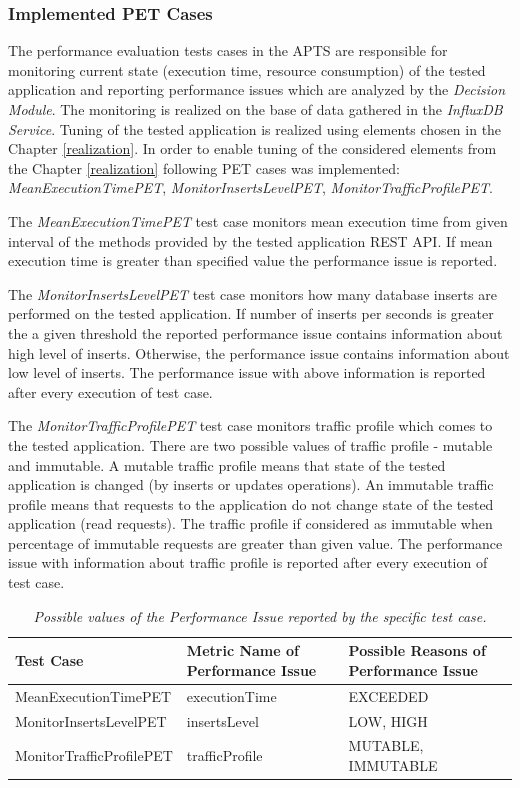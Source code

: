 \documentclass[10pt,a4paper]{article}
\begin{document}
\subsubsection{Implemented PET Cases} \label{dm}

 The performance evaluation tests cases in the APTS are responsible for monitoring current state (execution time, resource consumption) of the tested application and reporting performance issues which are analyzed by the \textit{Decision Module}. The monitoring is realized on the base of data gathered in the \textit{InfluxDB Service}.  Tuning of the tested application is realized using elements chosen in the Chapter \ref{realization}. In order to enable tuning of the considered elements from the Chapter \ref{realization} following PET cases was implemented: \textit{MeanExecutionTimePET}, \textit{MonitorInsertsLevelPET},  \textit{MonitorTrafficProfilePET}.
 
 The \textit{MeanExecutionTimePET} test case monitors mean execution time from given interval of the methods provided by the tested application REST API. If mean execution time is greater than specified value the performance issue is reported. 

The \textit{MonitorInsertsLevelPET} test case monitors how many database inserts are performed on the tested application. If number of inserts per seconds is greater the a given threshold the reported performance issue contains information about high level of inserts. Otherwise, the performance issue contains information about low level of inserts. The performance issue with above information is reported after every execution of test case. 

The \textit{MonitorTrafficProfilePET} test case monitors traffic profile which comes to the tested application. There are two possible values of traffic profile - mutable and immutable. A mutable traffic profile means that state of the tested application is changed (by inserts or updates operations). An immutable traffic profile means that requests to the application do not change state of the tested application (read requests). The traffic profile if considered as immutable when percentage  of immutable requests are greater than given value. The performance issue with information about traffic profile is reported after every execution of test case.

\begin{table}[!htb]
\def\arraystretch{1.5}
\caption{\textit{Possible values of the Performance Issue reported by the specific test case.}}\label{testcasescomp}
\begin{tabularx}{\textwidth}{X|X|p{3.8cm}}
\textbf{Test Case} & \textbf{Metric Name of Performance Issue} & \textbf{Possible Reasons of Performance Issue} \\ \hline
MeanExecutionTimePET & executionTime & EXCEEDED \\\hline
MonitorInsertsLevelPET & insertsLevel &LOW, HIGH \\\hline
MonitorTrafficProfilePET & trafficProfile & MUTABLE, IMMUTABLE \\
\end{tabularx}
\end{table}
\end{document}
